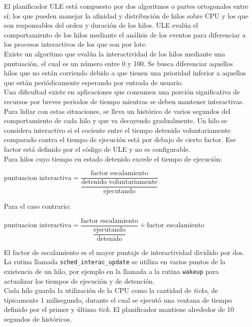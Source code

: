 \documentclass[a4paper]{book}
\begin{document}
El planificador ULE est\'a compuesto por dos algoritmos o partes ortogonales entre sí; los que pueden manejar la afinidad y distribución de hilos sobre CPU y los que son responsables del orden y duración de los hilos. ULE eval\'ua el comportamiento de los hilos mediante el análisis de los eventos para diferenciar a los procesos interactivos de los que son por lote.\\

Existe un algoritmo que evalúa la interactividad de los hilos mediante una puntuación, el cual es un número entre 0 y 100. Se busca diferenciar aquellos hilos que no están corriendo debido a que tienen una prioridad inferior a aquellos que están periódicamente esperando por entrada de usuario.\\

Una dificultad existe en aplicaciones que consumen una porción significativa de recursos por breves periodos de tiempo mientras se deben mantener interactivas. Para lidiar con estas situaciones, se lleva un histórico de varios segundos del comportamiento de cada hilo y que va decayendo gradualmente. Un hilo se considera interactivo si el cociente entre el tiempo detenido voluntariamente comparado contra el tiempo de ejecución está por debajo de cierto factor. Ese factor está definido por el código de ULE y no es configurable.\\

Para hilos cuyo tiempo en estado detenido excede el tiempo de ejecuci\'on:\\
\begin{center}
$
	\text{puntuacion interactiva}= \dfrac{\text{factor escalamiento}}{\dfrac{\text{detenido voluntariamente}}{\text{ejecutando}}}
$
\end{center}

Para el caso contrario:
\begin{center}
$
	\text{puntuacion interactiva}= \dfrac{\text{factor escalamiento}}{\dfrac{\text{ejecutando}}{\text{detenido}}} + \text{factor escalamiento}
$
\end{center}

El factor de escalamiento es el mayor puntaje de interactividad dividido por dos.
La rutina llamada \verb|sched_interac_update| se utiliza en varios puntos de la existencia de un hilo, por ejemplo en la llamada a la rutina \verb|wakeup| para actualizar los tiempos de ejecución y de detención.\\

Cada hilo guarda la utilización de la CPU como la cantidad de \emph{ticks}, de típicamente 1 milisegundo, durante el cual se ejecutó una ventana de tiempo definido por el primer y último \emph{tick}. El planificador mantiene alrededor de 10 segundos de históricos.\\
\end{document}
